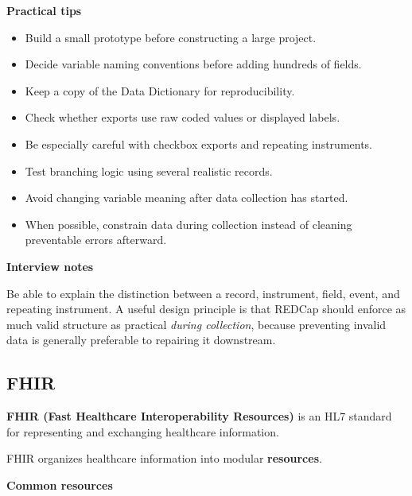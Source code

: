 \documentclass[11pt,letterpaper]{article}
\begin{document}
\textbf{Practical tips}

\begin{itemize}[leftmargin=*]
    \item Build a small prototype before constructing a large project.
    \item Decide variable naming conventions before adding hundreds of fields.
    \item Keep a copy of the Data Dictionary for reproducibility.
    \item Check whether exports use raw coded values or displayed labels.
    \item Be especially careful with checkbox exports and repeating instruments.
    \item Test branching logic using several realistic records.
    \item Avoid changing variable meaning after data collection has started.
    \item When possible, constrain data during collection instead of cleaning
    preventable errors afterward.
\end{itemize}

\textbf{Interview notes}

Be able to explain the distinction between a record, instrument, field, event,
and repeating instrument. A useful design principle is that REDCap should
enforce as much valid structure as practical \emph{during collection}, because
preventing invalid data is generally preferable to repairing it downstream.



\subsection{FHIR}

\textbf{FHIR (Fast Healthcare Interoperability Resources)} is an HL7 standard
for representing and exchanging healthcare information.

FHIR organizes healthcare information into modular
\textbf{resources}.

\textbf{Common resources}
\end{document}
